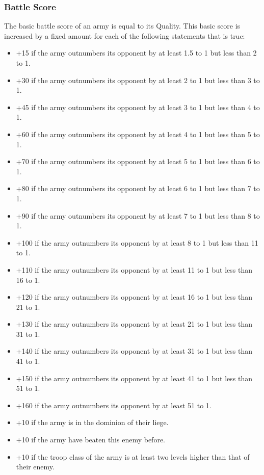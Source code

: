 \begin{multicols*}{2}

\subsubsection{Battle Score}
The basic battle score of an army is equal to its Quality. This basic score is increased by a fixed amount for each of the following statements that is true:

\begin{itemize}
	\item{+15 if the army outnumbers its opponent by at least 1.5 to 1 but less than 2 to 1.}
	\item{+30 if the army outnumbers its opponent by at least 2 to 1 but less than 3 to 1.}
	\item{+45 if the army outnumbers its opponent by at least 3 to 1 but less than 4 to 1.}
	\item{+60 if the army outnumbers its opponent by at least 4 to 1 but less than 5 to 1.}
	\item{+70 if the army outnumbers its opponent by at least 5 to 1 but less than 6 to 1.}
	\item{+80 if the army outnumbers its opponent by at least 6 to 1 but less than 7 to 1.}
	\item{+90 if the army outnumbers its opponent by at least 7 to 1 but less than 8 to 1.}
	\item{+100 if the army outnumbers its opponent by at least 8 to 1 but less than 11 to 1.}
	\item{+110 if the army outnumbers its opponent by at least 11 to 1 but less than 16 to 1.}
	\item{+120 if the army outnumbers its opponent by at least 16 to 1 but less than 21 to 1.}
	\item{+130 if the army outnumbers its opponent by at least 21 to 1 but less than 31 to 1.}
	\item{+140 if the army outnumbers its opponent by at least 31 to 1 but less than 41 to 1.}
	\item{+150 if the army outnumbers its opponent by at least 41 to 1 but less than 51 to 1.}
	\item{+160 if the army outnumbers its opponent by at least 51 to 1.}
	\item{+10 if the army is in the dominion of their liege.}
	\item{+10 if the army have beaten this enemy before.}
	\item{+10 if the troop class of the army is at least two levels higher than that of their enemy.}

\end{itemize}
\end{multicols*}
